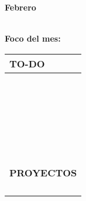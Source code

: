 {\raggedleft
	\fontsize{25}{50}\selectfont
	\textbf{Febrero}\\
}



	\textbf{\\Foco del mes:} \dotfill
	\renewcommand{\arraystretch}{1.5}\scriptsize
		\begin{longtabu} to \textwidth { X[l]}
		\centering \small{\textbf{TO-DO}} \\
		\toprule
		\makebox{$\square$} \dotfill\\
		\makebox{$\square$} \dotfill\\
		\makebox{$\square$} \dotfill\\
		\makebox{$\square$} \dotfill\\
		\makebox{$\square$} \dotfill\\
		\makebox{$\square$} \dotfill\\
		\makebox{$\square$} \dotfill\\
		\makebox{$\square$} \dotfill\\
		\makebox{$\square$} \dotfill\\
		\makebox{$\square$} \dotfill\\
		\makebox{$\square$} \dotfill\\
		\makebox{$\square$} \dotfill\\
		\makebox{$\square$} \dotfill\\
		\makebox{$\square$} \dotfill\\
		\makebox{$\square$} \dotfill\\
		\makebox{$\square$} \dotfill\\
		\makebox{$\square$} \dotfill\\
		\makebox{$\square$} \dotfill\\
		\makebox{$\square$} \dotfill\\
		\makebox{$\square$} \dotfill\\
		\makebox{$\square$} \dotfill\\
		\makebox{$\square$} \dotfill\\
		\makebox{$\square$} \dotfill\\
		\makebox{$\square$} \dotfill\\
		\makebox{$\square$} \dotfill\\

		\bottomrule

		\\
		\small{\textbf{PROYECTOS}} \\
		\makebox{$\square$} \dotfill\\
		\makebox{$\square$} \dotfill\\
		\makebox{$\square$} \dotfill\\
		\makebox{$\square$} \dotfill\\
	\end{longtabu}


